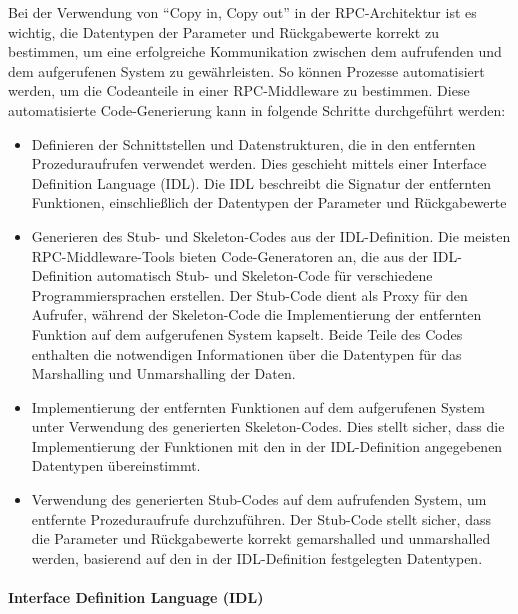 \documentclass[../vs-script-first-v01.tex]{subfiles}
\begin{document}
Bei der Verwendung von \enquote{Copy in, Copy out} in der RPC-Architektur ist es wichtig, die Datentypen der Parameter und Rückgabewerte korrekt zu bestimmen, um eine erfolgreiche Kommunikation zwischen dem aufrufenden und dem aufgerufenen System zu gewährleisten. So können Prozesse automatisiert werden, um die Codeanteile in einer RPC-Middleware zu bestimmen. Diese automatisierte Code-Generierung kann in folgende Schritte durchgeführt werden:
\begin{itemize} 
\item Definieren der Schnittstellen und Datenstrukturen, die in den entfernten Prozeduraufrufen verwendet werden. Dies geschieht mittels einer Interface Definition Language (IDL). Die IDL beschreibt die Signatur der entfernten Funktionen, einschließlich der Datentypen der Parameter und Rückgabewerte
\item Generieren des Stub- und Skeleton-Codes aus der IDL-Definition. Die meisten RPC-Middleware-Tools bieten Code-Generatoren an, die aus der IDL-Definition automatisch Stub- und Skeleton-Code für verschiedene Programmiersprachen erstellen. Der Stub-Code dient als Proxy für den Aufrufer, während der Skeleton-Code die Implementierung der entfernten Funktion auf dem aufgerufenen System kapselt. Beide Teile des Codes enthalten die notwendigen Informationen über die Datentypen für das Marshalling und Unmarshalling der Daten.
\item Implementierung der entfernten Funktionen auf dem aufgerufenen System unter Verwendung des generierten Skeleton-Codes. Dies stellt sicher, dass die Implementierung der Funktionen mit den in der IDL-Definition angegebenen Datentypen übereinstimmt.
\item  Verwendung des generierten Stub-Codes auf dem aufrufenden System, um entfernte Prozeduraufrufe durchzuführen. Der Stub-Code stellt sicher, dass die Parameter und Rückgabewerte korrekt gemarshalled und unmarshalled werden, basierend auf den in der IDL-Definition festgelegten Datentypen.
\end{itemize} 

\paragraph{Interface Definition Language (IDL)\\\\}
\end{document}
